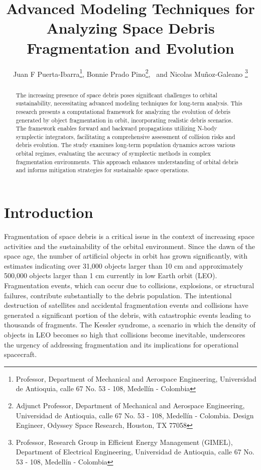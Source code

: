 \documentclass[letterpaper, preprint, paper,11pt]{AAS}	%
\begin{document}
\title{Advanced Modeling Techniques for Analyzing Space Debris Fragmentation and Evolution}

\author{Juan F Puerta-Ibarra\thanks{Professor, Department of Mechanical and Aerospace Engineering, Universidad de Antioquia, calle 67 No. 53 - 108, Medellín - Colombia},  
Bonnie Prado Pino\thanks{Adjunct Professor, Department of Mechanical and Aerospace Engineering, Universidad de Antioquia, calle 67 No. 53 - 108, Medellín - Colombia. Design Engineer, Odyssey Space Research, Houston, TX 77058},
\ and Nicolas Muñoz-Galeano \thanks{Professor, Research Group in Efficient Energy Management (GIMEL), Department of Electrical Engineering, Universidad de Antioquia, calle 67 No. 53 - 108, Medellín - Colombia}
}

\maketitle{} 		

\begin{abstract}
The increasing presence of space debris poses significant challenges to orbital sustainability, necessitating advanced modeling techniques for long-term analysis. This research presents a computational framework for analyzing the evolution of debris generated by object fragmentation in orbit, incorporating realistic debris scenarios. The framework enables forward and backward propagations utilizing N-body\cite{tamayo_reboundx_2020} symplectic integrators, facilitating a comprehensive assessment of collision risks and debris evolution. The study examines long-term population dynamics across various orbital regimes, evaluating the accuracy of symplectic methods in complex fragmentation environments. This approach enhances understanding of orbital debris and informs mitigation strategies for sustainable space operations.
\end{abstract}

\section{Introduction}
Fragmentation of space debris is a critical issue in the context of increasing space activities and the sustainability of the orbital environment. Since the dawn of the space age, the number of artificial objects in orbit has grown significantly, with estimates indicating over 31,000 objects larger than 10 cm and approximately 500,000 objects larger than 1 cm currently in low Earth orbit (LEO)\cite{pastor_early_2023}. Fragmentation events, which can occur due to collisions, explosions, or structural failures, contribute substantially to the debris population\cite{francesconi_cst_2019}. The intentional destruction of satellites and accidental fragmentation events and collisions have generated a significant portion of the debris, with catastrophic events leading to thousands of fragments\cite{noauthor_esas_nodate}. The Kessler syndrome, a scenario in which the density of objects in LEO becomes so high that collisions become inevitable, underscores the urgency of addressing fragmentation and its implications for operational spacecraft\cite{kessler_environment_1985}.
\end{document}
